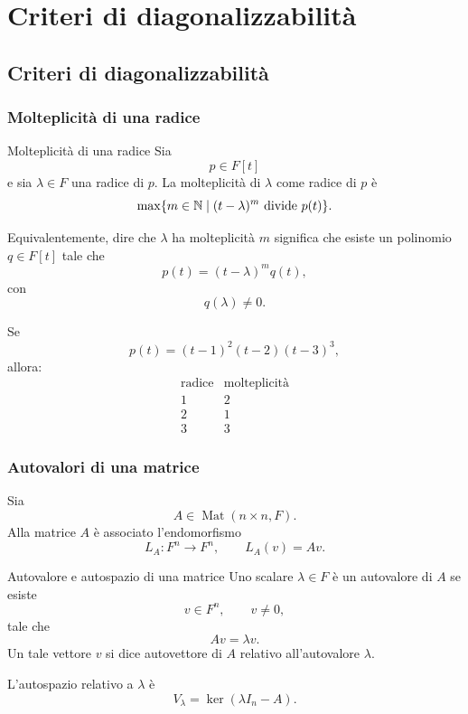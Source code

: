\documentclass[a4paper]{article}
\begin{document}
\section{Criteri di diagonalizzabilità}

\subsection{Criteri di diagonalizzabilità}

\subsubsection{Molteplicità di una radice}

\begin{snippetdefinition}{Molteplicità di una radice}
    Sia
    \[
        p\in F[t]
    \]
    e sia \(\lambda\in F\) una radice di \(p\). La molteplicità di \(\lambda\) come radice di \(p\) è
    \[
        \max\{m\in\mathbb{N} \mid (t-\lambda)^m \text{ divide } p(t)\}.
    \]
\end{snippetdefinition}

Equivalentemente, dire che \(\lambda\) ha molteplicità \(m\) significa che esiste un polinomio \(q\in F[t]\) tale che
\[
    p(t)=(t-\lambda)^m q(t),
\]
con
\[
    q(\lambda)\neq 0.
\]

\begin{snippetexample}{}
    Se
    \[
        p(t)=(t-1)^2(t-2)(t-3)^3,
    \]
    allora:
    \[
        \begin{array}{c|c}
            \text{radice} & \text{molteplicità}\\
            \hline
            1 & 2\\
            2 & 1\\
            3 & 3
        \end{array}
    \]
\end{snippetexample}

\subsubsection{Autovalori di una matrice}

Sia
\[
    A\in\operatorname{Mat}(n\times n,F).
\]
Alla matrice \(A\) è associato l'endomorfismo
\[
    L_A:F^n\to F^n,
    \qquad
    L_A(v)=Av.
\]

\begin{snippetdefinition}{Autovalore e autospazio di una matrice}
    Uno scalare \(\lambda\in F\) è un autovalore di \(A\) se esiste
    \[
        v\in F^n,
        \qquad
        v\neq 0,
    \]
    tale che
    \[
        Av=\lambda v.
    \]
    Un tale vettore \(v\) si dice autovettore di \(A\) relativo all'autovalore \(\lambda\).

    L'autospazio relativo a \(\lambda\) è
    \[
        V_\lambda
        =
        \ker(\lambda I_n-A).
    \]
\end{snippetdefinition}
\end{document}
